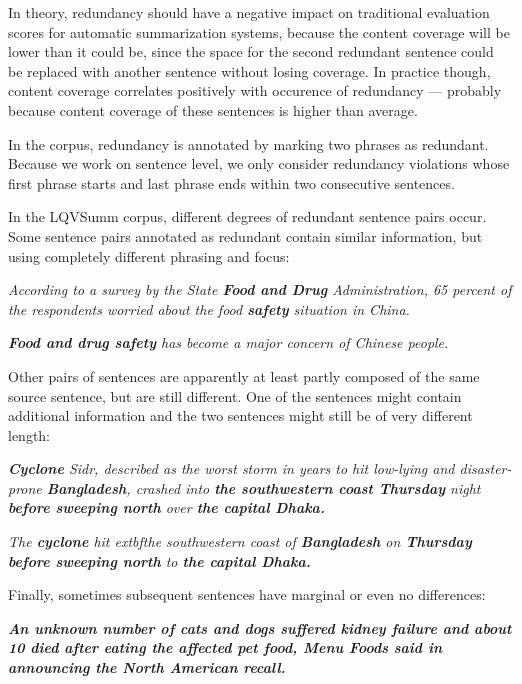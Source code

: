 \documentclass[a4paper,10pt]{scrartcl}
\theoremstyle{style}
\begin{document}

In theory, redundancy should have a negative impact on traditional evaluation scores for automatic summarization systems, because the content coverage will be lower than it could be, since the space for the second redundant sentence could be replaced with another sentence without losing coverage. In practice though, content coverage correlates positively with occurence of redundancy \citep[see][]{friedrichlqvsumm} --- probably because content coverage of these sentences is higher than average.

In the corpus, redundancy is annotated by marking two phrases as redundant. Because we work on sentence level, we only consider redundancy violations whose first phrase starts and last phrase ends within two consecutive sentences.

In the LQVSumm corpus, different degrees of redundant sentence pairs occur.
Some sentence pairs annotated as redundant contain similar information, but using completely different phrasing and focus:

\textit{According to a survey by the State \textbf{Food and Drug} Administration, 65 percent of the respondents worried about the food \textbf{safety} situation in China.}

\textit{\textbf{Food and drug safety} has become a major concern of Chinese people.}

Other pairs of sentences are apparently at least partly composed of the same source sentence, but are still different. One of the sentences might contain additional information and the two sentences might still be of very different length:

\textit{\textbf{Cyclone} Sidr, described as the worst storm in years to hit low-lying and disaster-prone \textbf{Bangladesh}, crashed into \textbf{the southwestern coast Thursday} night \textbf{before sweeping north} over \textbf{the capital Dhaka.}}

\textit{The \textbf{cyclone} hit \†extbf{the southwestern coast} of \textbf{Bangladesh} on \textbf{Thursday before sweeping north} to \textbf{the capital Dhaka.}}

Finally, sometimes subsequent sentences have marginal or even no differences:

\textit{\textbf{An unknown number of cats and dogs suffered kidney failure and about 10 died after eating the affected pet food, Menu Foods said in announcing the North American recall.}}
\end{document}
